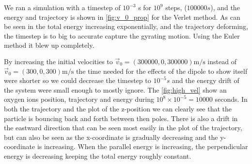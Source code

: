 \documentclass[x11names]{article}
\renewcommand{\va}{\vec}
\begin{document}
    


    We ran a simulation with a timestep of \(10^{-3}\) s for \(10^9\) steps, (\(100000 s\)), and the energy and trajectory is shown in \cref{fig:v_0_prop} for the Verlet method. As can be seen in the total energy increasing exponentially, and the trajectory deforming, the timestep is to big to accurate capture the gyrating motion. Using the Euler method it blew up completely.

    By increasing the initial velocities to \(\va{v}_0 = (300000, 0, 300000) \si{\meter \per \second}\) instead of \(\va{v}_0 = (300, 0, 300) \si{\meter \per \second}\) the time needed for the effects of the dipole to show itself were shorter so we could decrease the timestep to \(10^{-5} \si{s}\) and the energy drift of the system were small enough to mostly ignore. The \cref{fig:high_vel} show an oxygen ions position, trajectory and energy during \(10^8\times 10^{-5} = 10000 \) seconds. In both the trajectory and the plot of the z-position we can clearly see that the particle is bouncing back and forth between then poles. There is also a drift in the eastward direction that can be seen most easily in the plot of the trajectory, but can also be seen as the x-coordinate is gradually decreasing and the y-coordinate is increasing.     When the parallel energy is increasing, the perpendicular energy is decreasing keeping the total energy roughly constant.
\end{document}
